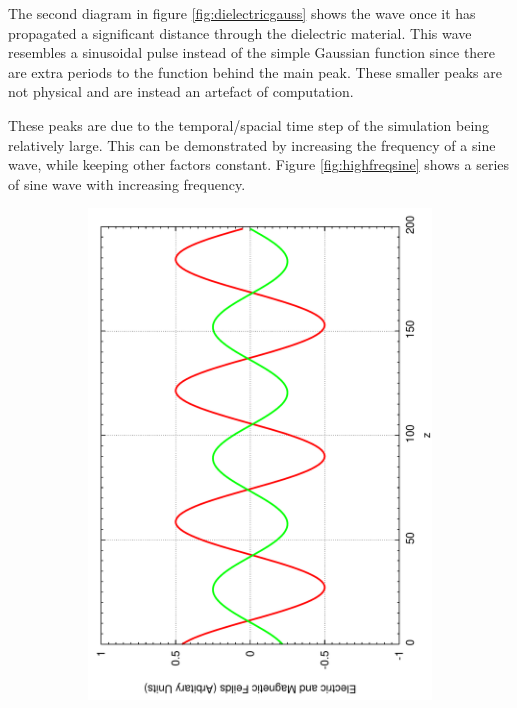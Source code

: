 The second diagram in figure \ref{fig:dielectricgauss} shows the wave once it has propagated a significant distance through the dielectric material. This wave resembles a sinusoidal pulse instead of the simple Gaussian function since there are extra periods to the function behind the main peak. These smaller peaks are not physical and are instead an artefact of computation.

These peaks are due to the temporal/spacial time step of the simulation being relatively large. This can be demonstrated by increasing the frequency of a sine wave, while keeping other factors constant. Figure \ref{fig:highfreqsine} shows a series of sine wave with increasing frequency.
\begin{figure}[ht]
        \centering
        \begin{subfigure}[ht]{0.45\textwidth}
                \centering
                \includegraphics[angle=270, width=\textwidth]{highfreqsine1.pdf}

\end{subfigure}
\end{figure}
